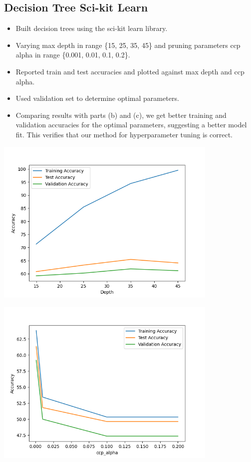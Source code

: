 \documentclass[12pt]{article}
\begin{document}
\subsection{Decision Tree Sci-kit Learn}
    \begin{itemize}
        \item Built decision trees using the sci-kit learn library.
        \item Varying max depth in range \{15, 25, 35, 45\} and pruning parameters ccp alpha in range \{0.001, 0.01, 0.1, 0.2\}.
        \item Reported train and test accuracies and plotted against max depth and ccp alpha.
        \item Used validation set to determine optimal parameters.
        \item Comparing results with parts (b) and (c), we get better training and validation accuracies for the optimal parameters, suggesting a better model fit. This verifies that our method for hyperparameter tuning is correct.
    \end{itemize}

\begin{center}
    \includegraphics[width=0.8\textwidth]{Assignment 3/q1/(d)depth_vs_accuracy.png}
\end{center}

\begin{center}
    \includegraphics[width=0.8\textwidth]{Assignment 3/q1/(d)ccp_vs_accuracy.png}
\end{center}
\end{document}
